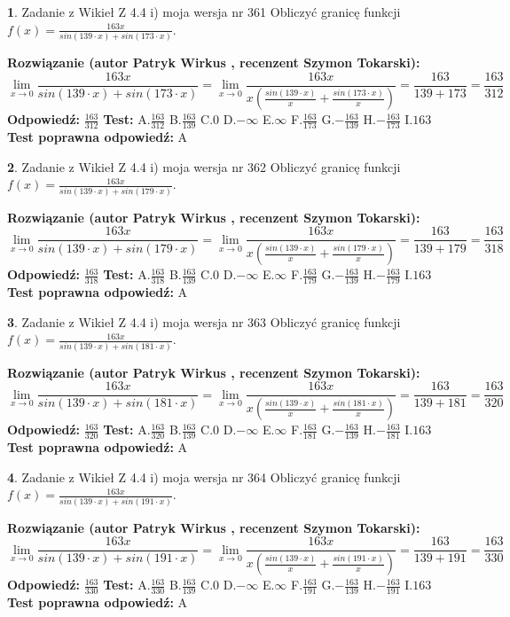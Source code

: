 \documentclass[12pt, a4paper]{article}
\theoremstyle{definition} %
\newtheorem{zad}{}
\newcommand{\zadStart}[1]{\begin{zad}#1\newline}
\newcommand{\zadStop}{\end{zad}}
\newcommand{\rozwStart}[2]{\noindent \textbf{Rozwiązanie (autor #1 , recenzent #2): }\newline}
\newcommand{\rozwStop}{\newline}
\newcommand{\odpStart}{\noindent \textbf{Odpowiedź:}\newline}
\newcommand{\odpStop}{\newline}
\newcommand{\testStart}{\noindent \textbf{Test:}\newline}
\newcommand{\testStop}{\newline}
\newcommand{\kluczStart}{\noindent \textbf{Test poprawna odpowiedź:}\newline}
\newcommand{\kluczStop}{\newline}
\begin{document}
\zadStart{Zadanie z Wikieł Z 4.4 i) moja wersja nr 361}
Obliczyć granicę funkcji $f(x)=\frac{163x}{sin(139\cdot x) +sin(173\cdot x)}$.
\zadStop
\rozwStart{Patryk Wirkus}{Szymon Tokarski}
$$\lim\limits_{x\to 0}\frac{163x}{sin(139\cdot x) +sin(173\cdot x)}=\lim\limits_{x\to 0}\frac{163x}{x(\frac{sin(139\cdot x)}{x}+\frac{sin(173\cdot x)}{x})}=\frac{163}{139+173} = \frac{163}{312}$$
\rozwStop
\odpStart
$\frac{163}{312}$
\odpStop
\testStart
A.$\frac{163}{312}$
B.$\frac{163}{139}$
C.$0$
D.$-\infty$
E.$\infty$
F.$\frac{163}{173}$
G.$-\frac{163}{139}$
H.$-\frac{163}{173}$
I.$163$
\testStop
\kluczStart
A
\kluczStop



\zadStart{Zadanie z Wikieł Z 4.4 i) moja wersja nr 362}
Obliczyć granicę funkcji $f(x)=\frac{163x}{sin(139\cdot x) +sin(179\cdot x)}$.
\zadStop
\rozwStart{Patryk Wirkus}{Szymon Tokarski}
$$\lim\limits_{x\to 0}\frac{163x}{sin(139\cdot x) +sin(179\cdot x)}=\lim\limits_{x\to 0}\frac{163x}{x(\frac{sin(139\cdot x)}{x}+\frac{sin(179\cdot x)}{x})}=\frac{163}{139+179} = \frac{163}{318}$$
\rozwStop
\odpStart
$\frac{163}{318}$
\odpStop
\testStart
A.$\frac{163}{318}$
B.$\frac{163}{139}$
C.$0$
D.$-\infty$
E.$\infty$
F.$\frac{163}{179}$
G.$-\frac{163}{139}$
H.$-\frac{163}{179}$
I.$163$
\testStop
\kluczStart
A
\kluczStop



\zadStart{Zadanie z Wikieł Z 4.4 i) moja wersja nr 363}
Obliczyć granicę funkcji $f(x)=\frac{163x}{sin(139\cdot x) +sin(181\cdot x)}$.
\zadStop
\rozwStart{Patryk Wirkus}{Szymon Tokarski}
$$\lim\limits_{x\to 0}\frac{163x}{sin(139\cdot x) +sin(181\cdot x)}=\lim\limits_{x\to 0}\frac{163x}{x(\frac{sin(139\cdot x)}{x}+\frac{sin(181\cdot x)}{x})}=\frac{163}{139+181} = \frac{163}{320}$$
\rozwStop
\odpStart
$\frac{163}{320}$
\odpStop
\testStart
A.$\frac{163}{320}$
B.$\frac{163}{139}$
C.$0$
D.$-\infty$
E.$\infty$
F.$\frac{163}{181}$
G.$-\frac{163}{139}$
H.$-\frac{163}{181}$
I.$163$
\testStop
\kluczStart
A
\kluczStop



\zadStart{Zadanie z Wikieł Z 4.4 i) moja wersja nr 364}
Obliczyć granicę funkcji $f(x)=\frac{163x}{sin(139\cdot x) +sin(191\cdot x)}$.
\zadStop
\rozwStart{Patryk Wirkus}{Szymon Tokarski}
$$\lim\limits_{x\to 0}\frac{163x}{sin(139\cdot x) +sin(191\cdot x)}=\lim\limits_{x\to 0}\frac{163x}{x(\frac{sin(139\cdot x)}{x}+\frac{sin(191\cdot x)}{x})}=\frac{163}{139+191} = \frac{163}{330}$$
\rozwStop
\odpStart
$\frac{163}{330}$
\odpStop
\testStart
A.$\frac{163}{330}$
B.$\frac{163}{139}$
C.$0$
D.$-\infty$
E.$\infty$
F.$\frac{163}{191}$
G.$-\frac{163}{139}$
H.$-\frac{163}{191}$
I.$163$
\testStop
\kluczStart
A
\kluczStop
\end{document}
